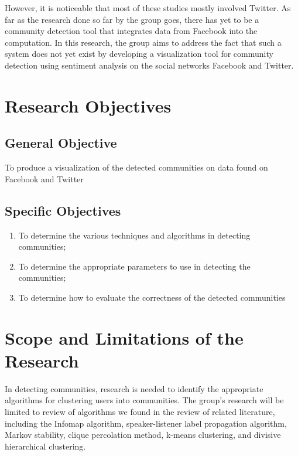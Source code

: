 However, it is noticeable that most of these studies mostly involved Twitter. As far as the research done so far by the group goes, there has yet to be a community detection tool that integrates data from Facebook into the computation. In this research, the group aims to address the fact that such a system does not yet exist by developing a visualization tool for community detection using sentiment analysis on the social networks Facebook and Twitter.

\section{Research Objectives}
\label{sec:researchobjectives}

\subsection{General Objective}
\label{sec:generalobjective}

To produce a visualization of the detected communities on data found on Facebook and Twitter

\subsection{Specific Objectives}
\label{sec:specificobjectives}

\begin{enumerate}
	\item To determine the various techniques and algorithms in detecting communities;
	\item To determine the appropriate parameters to use in detecting the communities;
	\item To determine how to evaluate the correctness of the detected communities
\end{enumerate}

\section{Scope and Limitations of the Research}
\label{sec:scopelimitations}

In detecting communities, research is needed to identify the appropriate algorithms for clustering users into communities. The group’s research will be limited to review of algorithms we found in the review of related literature, including the Infomap algorithm, speaker-listener label propagation algorithm, Markov stability, clique percolation method, k-means clustering, and divisive hierarchical clustering.


